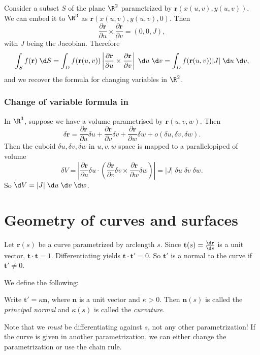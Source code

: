 \documentclass[a4paper]{article}
\begin{document}
Consider a subset $S$ of the plane $\R^2$ parametrized by $\mathbf{r}(x(u, v), y(u, v))$. We can embed it to $\R^3$ as $\mathbf{r}(x(u, v), y(u, v), 0)$. Then
\[
  \frac{\partial \mathbf{r}}{\partial u}\times \frac{\partial\mathbf{r}}{\partial v} = (0, 0, J),
\]
with $J$ being the Jacobian.
Therefore
\[
  \int_S f(\mathbf{r})\;\d S = \int_D f(\mathbf{r}(u, v)) \left|\frac{\partial \mathbf{r}}{\partial u}\times \frac{\partial \mathbf{r}}{\partial v}\right| \;\d u\;\d v= \int_D f(\mathbf{r}(u, v))|J|\;\d u\;\d v,
\]
and we recover the formula for changing variables in $\R^2$.

\subsubsection*{Change of variable formula in }
In $\R^3$, suppose we have a volume parametrised by $\mathbf{r}(u, v, w)$. Then
\[
  \delta \mathbf{r} = \frac{\partial \mathbf{r}}{\partial u}\delta u + \frac{\partial \mathbf{r}}{\partial v}\delta v + \frac{\partial \mathbf{r}}{\partial w}\delta w + o(\delta u, \delta v, \delta w).
\]
Then the cuboid $\delta u, \delta v, \delta w$ in $u, v, w$ space is mapped to a parallelopiped of volume
\[
  \delta V = \left|\frac{\partial \mathbf{r}}{\partial u}\delta u\cdot \left( \frac{\partial \mathbf{r}}{\partial v}\delta v \times \frac{\partial \mathbf{r}}{\partial w}\delta w\right)\right| = |J|\;\delta u\; \delta v\;\delta w.
\]
So $\d V = |J|\; \d u\; \d v\; \d w$.

\section{Geometry of curves and surfaces}
Let $\mathbf{r}(s)$ be a curve parametrized by arclength $s$. Since $\mathbf{t}(s) = \frac{\d \mathbf{r}}{\d s}$ is a unit vector, $\mathbf{t}\cdot \mathbf{t} = 1$. Differentiating yields $\mathbf{t}\cdot \mathbf{t}' = 0$. So $\mathbf{t}'$ is a normal to the curve if $\mathbf{t}' \not= 0$.

We define the following:
\begin{defi}
  Write $\mathbf{t}' = \kappa \mathbf{n}$, where $\mathbf{n}$ is a unit vector and $\kappa > 0$. Then $\mathbf{n}(s)$ is called the \emph{principal normal} and $\kappa(s)$ is called the \emph{curvature}.
\end{defi}
Note that we \emph{must} be differentiating against $s$, not any other parametrization! If the curve is given in another parametrization, we can either change the parametrization or use the chain rule.
\end{document}
